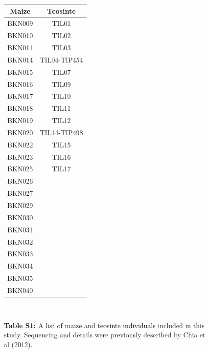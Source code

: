 \documentclass{article}
\begin{document}
\begin{figure}[h!]
  \begin{center}
  \begin{tabular}{c|c}
    \bf Maize & \bf Teosinte \\ \hline \hline
    BKN009 &  TIL01 \\
    BKN010 & TIL02 \\
    BKN011 & TIL03 \\
    BKN014 & TIL04-TIP454 \\
    BKN015 & TIL07 \\
    BKN016 & TIL09 \\
    BKN017 & TIL10 \\
    BKN018 & TIL11 \\
    BKN019 & TIL12 \\
    BKN020 & TIL14-TIP498 \\
    BKN022 & TIL15 \\
    BKN023 & TIL16 \\
    BKN025 & TIL17 \\
    BKN026 & \\
    BKN027 & \\
    BKN029 & \\
    BKN030 & \\
    BKN031 & \\
    BKN032 & \\
    BKN033 & \\
    BKN034 & \\
    BKN035 & \\
    BKN040 & \\
  \end{tabular} \\
  \end{center}
      {\bf Table S1:} A list of maize and teosinte individuals included in this study. Sequencing and details were previously described by Chia et al (2012).
\end{figure}
\end{document}
